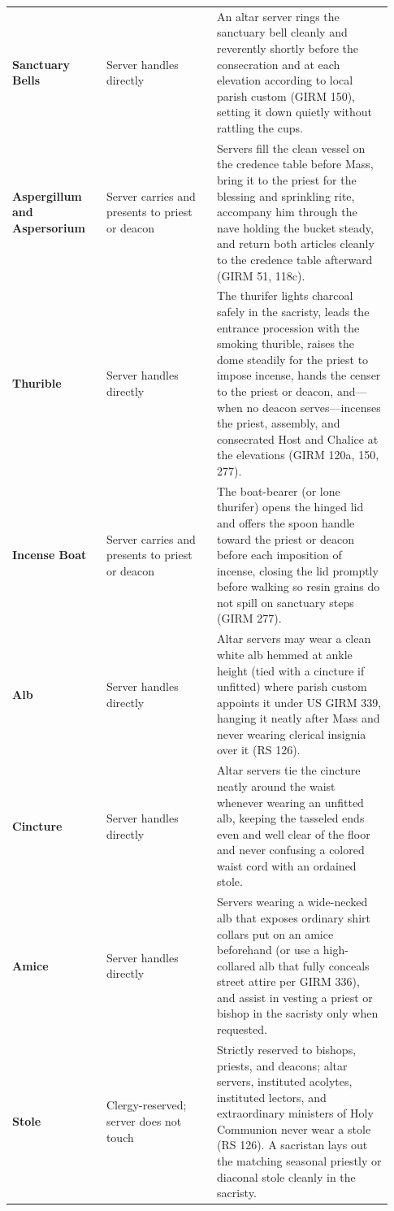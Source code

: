{\begin{longtable}{>{\raggedright\arraybackslash}p{0.23\linewidth}>{\raggedright\arraybackslash}p{0.27\linewidth}>{\raggedright\arraybackslash}p{0.43\linewidth}}
\textbf{Sanctuary Bells} & Server handles directly & An altar server rings the sanctuary bell cleanly and reverently shortly before the consecration and at each elevation according to local parish custom (GIRM 150), setting it down quietly without rattling the cups. \\
\textbf{Aspergillum and Aspersorium} & Server carries and presents to priest or deacon & Servers fill the clean vessel on the credence table before Mass, bring it to the priest for the blessing and sprinkling rite, accompany him through the nave holding the bucket steady, and return both articles cleanly to the credence table afterward (GIRM 51, 118c). \\
\textbf{Thurible} & Server handles directly & The thurifer lights charcoal safely in the sacristy, leads the entrance procession with the smoking thurible, raises the dome steadily for the priest to impose incense, hands the censer to the priest or deacon, and---when no deacon serves---incenses the priest, assembly, and consecrated Host and Chalice at the elevations (GIRM 120a, 150, 277). \\
\textbf{Incense Boat} & Server carries and presents to priest or deacon & The boat-bearer (or lone thurifer) opens the hinged lid and offers the spoon handle toward the priest or deacon before each imposition of incense, closing the lid promptly before walking so resin grains do not spill on sanctuary steps (GIRM 277). \\
\textbf{Alb} & Server handles directly & Altar servers may wear a clean white alb hemmed at ankle height (tied with a cincture if unfitted) where parish custom appoints it under US GIRM 339, hanging it neatly after Mass and never wearing clerical insignia over it (RS 126). \\
\textbf{Cincture} & Server handles directly & Altar servers tie the cincture neatly around the waist whenever wearing an unfitted alb, keeping the tasseled ends even and well clear of the floor and never confusing a colored waist cord with an ordained stole. \\
\textbf{Amice} & Server handles directly & Servers wearing a wide-necked alb that exposes ordinary shirt collars put on an amice beforehand (or use a high-collared alb that fully conceals street attire per GIRM 336), and assist in vesting a priest or bishop in the sacristy only when requested. \\
\textbf{Stole} & Clergy-reserved; server does not touch & Strictly reserved to bishops, priests, and deacons; altar servers, instituted acolytes, instituted lectors, and extraordinary ministers of Holy Communion never wear a stole (RS 126). A sacristan lays out the matching seasonal priestly or diaconal stole cleanly in the sacristy. \\

\end{longtable}}
